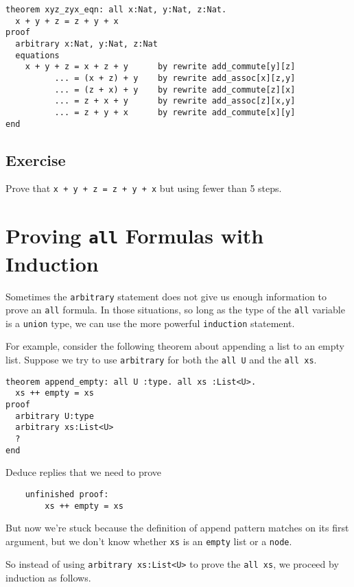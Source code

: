 \documentclass[12pt]{article}
\begin{document}
\begin{verbatim}
theorem xyz_zyx_eqn: all x:Nat, y:Nat, z:Nat.
  x + y + z = z + y + x
proof
  arbitrary x:Nat, y:Nat, z:Nat
  equations
    x + y + z = x + z + y      by rewrite add_commute[y][z]
          ... = (x + z) + y    by rewrite add_assoc[x][z,y]
          ... = (z + x) + y    by rewrite add_commute[z][x]
          ... = z + x + y      by rewrite add_assoc[z][x,y]
          ... = z + y + x      by rewrite add_commute[x][y]
end
\end{verbatim}

\subsection*{Exercise}

Prove that \texttt{x + y + z = z + y + x} but using fewer than 5 steps.

\pagebreak

\section{Proving \texttt{all} Formulas with Induction}
\label{sec:induction}

Sometimes the \texttt{arbitrary} statement does not give us enough
information to prove an \texttt{all} formula. In those situations, so
long as the type of the \texttt{all} variable is a \texttt{union}
type, we can use the more powerful \texttt{induction} statement.

For example, consider the following theorem about appending a list to
an empty list. Suppose we try to use \texttt{arbitrary} for both the
\texttt{all U} and the \texttt{all xs}.

\begin{verbatim}
theorem append_empty: all U :type. all xs :List<U>.
  xs ++ empty = xs
proof
  arbitrary U:type
  arbitrary xs:List<U>
  ?
end
\end{verbatim}

Deduce replies that we need to prove

\begin{verbatim}
    unfinished proof:
        xs ++ empty = xs
\end{verbatim}

But now we're stuck because the definition of append pattern matches
on its first argument, but we don't know whether \texttt{xs} is an
\texttt{empty} list or a \texttt{node}.

So instead of using \texttt{arbitrary xs:List<U>} to prove the
\texttt{all xs}, we proceed by induction as follows.
\end{document}
